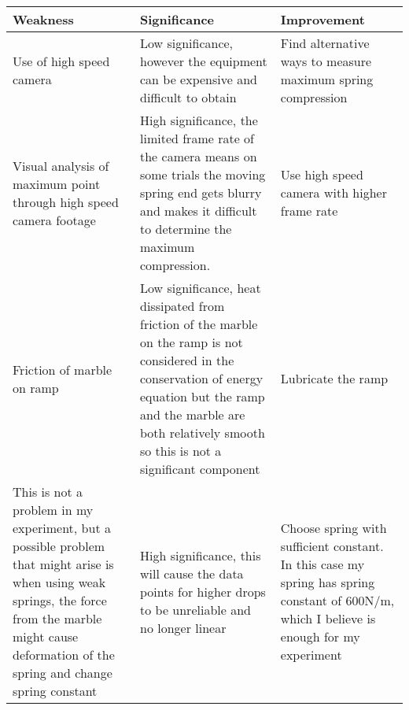 \begin{center}
    \begin{tabular}{|p{4cm}|p{4cm}|p{4cm}|} 
        \hline
        Weakness & Significance & Improvement \\ 
        \hline
        Use of high speed camera & Low significance, however the equipment can be expensive and difficult to obtain & Find alternative ways to measure maximum spring compression \\ 
        \hline
        Visual analysis of maximum point through high speed camera footage & High significance, the limited frame rate of the camera means on some trials the moving spring end gets blurry and makes it difficult to determine the maximum compression. & Use high speed camera with higher frame rate \\
        \hline
        Friction of marble on ramp & Low significance, heat dissipated from friction of the marble on the ramp is not considered in the conservation of energy equation but the ramp and the marble are both relatively smooth so this is not a significant component & Lubricate the ramp \\
        \hline
        This is not a problem in my experiment, but a possible problem that might arise is when using weak springs, the force from the marble might cause deformation of the spring and change spring constant & High significance, this will cause the data points for higher drops to be unreliable and no longer linear & Choose spring with sufficient constant. In this case my spring has spring constant of 600N/m, which I believe is enough for my experiment \\
        \hline
    \end{tabular}
\end{center}